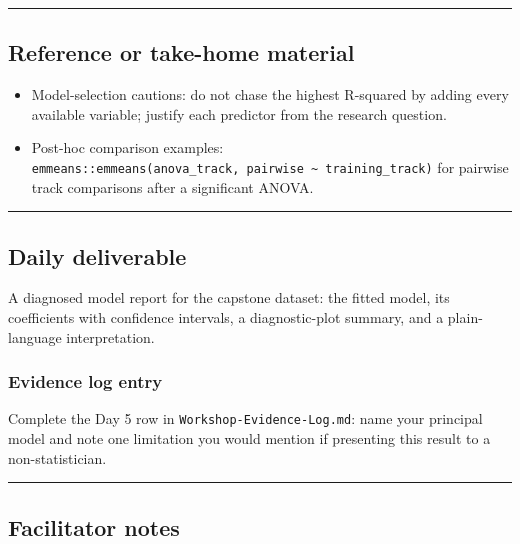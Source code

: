 \documentclass[11pt]{article}
\providecommand{\tightlist}{%
  \setlength{\itemsep}{0pt}\setlength{\parskip}{0pt}}
\begin{document}
\begin{center}\rule{0.5\linewidth}{0.5pt}\end{center}

\hypertarget{reference-or-take-home-material}{%
\subsection{Reference or take-home
material}\label{reference-or-take-home-material}}

\begin{itemize}
\tightlist
\item
  Model-selection cautions: do not chase the highest R-squared by adding
  every available variable; justify each predictor from the research
  question.
\item
  Post-hoc comparison examples:
  \texttt{emmeans::emmeans(anova\_track,\ pairwise\ \textasciitilde{}\ training\_track)}
  for pairwise track comparisons after a significant ANOVA.
\end{itemize}

\begin{center}\rule{0.5\linewidth}{0.5pt}\end{center}

\hypertarget{daily-deliverable}{%
\subsection{Daily deliverable}\label{daily-deliverable}}

A diagnosed model report for the capstone dataset: the fitted model, its
coefficients with confidence intervals, a diagnostic-plot summary, and a
plain-language interpretation.

\hypertarget{evidence-log-entry}{%
\subsubsection{Evidence log entry}\label{evidence-log-entry}}

Complete the Day 5 row in \texttt{Workshop-Evidence-Log.md}: name your
principal model and note one limitation you would mention if presenting
this result to a non-statistician.

\begin{center}\rule{0.5\linewidth}{0.5pt}\end{center}

\hypertarget{facilitator-notes}{%
\subsection{Facilitator notes}\label{facilitator-notes}}
\end{document}
